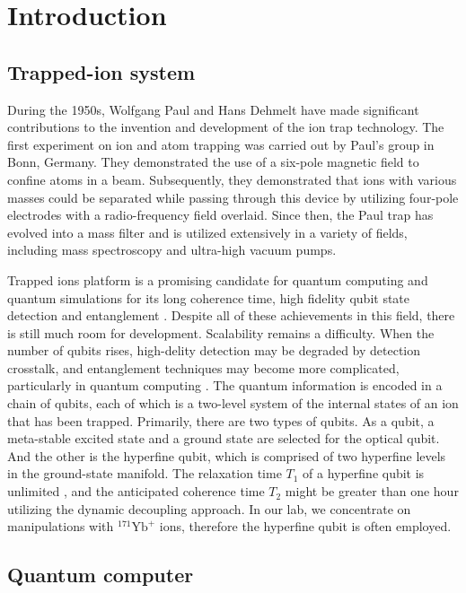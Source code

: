 
\chapter{Introduction}

\section{Trapped-ion system}

During the 1950s, Wolfgang Paul and Hans Dehmelt have made significant contributions to the invention and development of the ion trap technology. The first experiment on ion and atom trapping was carried out by Paul's group in Bonn, Germany. They demonstrated the use of a six-pole magnetic field to confine atoms in a beam. Subsequently, they demonstrated that ions with various masses could be separated while passing through this device by utilizing four-pole electrodes with a radio-frequency field overlaid. Since then, the Paul trap \cite{RevModPhys.62.531} has evolved into a mass filter and is utilized extensively in a variety of fields, including mass spectroscopy and ultra-high vacuum pumps.

Trapped ions platform is a promising candidate for quantum computing and quantum simulations for its long coherence time, high fidelity qubit state detection and entanglement \cite{RN297,RN125}. Despite all of these achievements in this field, there is still much room for development. Scalability remains a difficulty. When the number of qubits rises, high-delity detection may be degraded by detection crosstalk, and entanglement techniques may become more complicated, particularly in quantum computing \cite{RN125}. The quantum information is encoded in a chain of qubits, each of which is a two-level system of the internal states of an ion that has been trapped. Primarily, there are two types of qubits. As a qubit, a meta-stable excited state and a ground state are selected for the optical qubit. And the other is the hyperfine qubit, which is comprised of two hyperfine levels in the ground-state manifold. The relaxation time $T_1$ of a hyperfine qubit is unlimited , and the anticipated coherence time $T_2$ might be greater than one hour utilizing the dynamic decoupling approach. In our lab, we concentrate on manipulations with ${ }^{171} \mathrm{Yb}^{+}$ ions, therefore the hyperfine qubit is often employed.



\section{Quantum computer}

